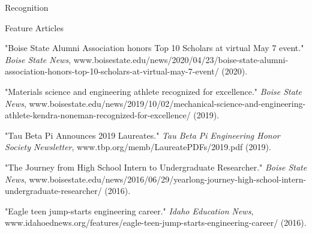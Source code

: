 \documentclass{resume} %
\begin{document}
\begin{rSection}{Recognition}
\begin{rSubsection3}{Feature Articles}{}{}{}
\item "Boise State Alumni Association honors Top 10 Scholars at virtual May 7 event." \textit{Boise State News}, www.boisestate.edu/news/2020/04/23/boise-state-alumni-association-honors-top-10-scholars-at-virtual-may-7-event/ (2020).
\item "Materials science and engineering athlete recognized for excellence." \textit{Boise State News}, www.boisestate.edu/news/2019/10/02/mechanical-science-and-engineering-athlete-kendra-noneman-recognized-for-excellence/ (2019).
\item "Tau Beta Pi Announces 2019 Laureates." \textit{Tau Beta Pi Engineering Honor Society Newsletter}, www.tbp.org/memb/LaureatePDFs/2019.pdf (2019).
\item "The Journey from High School Intern to Undergraduate Researcher." \textit{Boise State News}, www.boisestate.edu/news/2016/06/29/yearlong-journey-high-school-intern-undergraduate-researcher/ (2016).
\item "Eagle teen jump-starts engineering career." \textit{Idaho Education News}, www.idahoednews.org/features/eagle-teen-jump-starts-engineering-career/ (2016).
\end{rSubsection3}
\end{rSection}
\newpage
\end{document}
